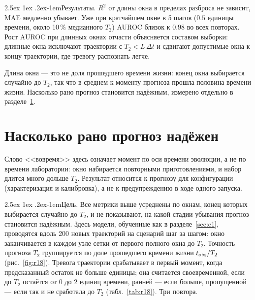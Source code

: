 \documentclass[12pt,a4paper]{report}
\makeatletter
\renewcommand\paragraph{\@startsection{paragraph}{4}{\z@}%
  {2.5ex \@plus1ex \@minus.2ex}{-1em}{\normalfont\normalsize\bfseries}}
\numberwithin{equation}{chapter}
\makeatother
\begin{document}
\paragraph{Результаты.} $R^2$ от длины окна в пределах разброса не зависит,
MAE медленно убывает. Уже при кратчайшем окне в 5 шагов ($0.5$ единицы
времени, около 10\,\% медианного $T_2$) AUROC близок к $0.98$ во всех
повторах. Рост AUROC при длинных окнах отчасти объясняется составом
выборки: длинные окна исключают траектории с $T_2<L\,\Delta t$ и сдвигают
допустимые окна к концу траектории, где тревогу распознать легче.

Длина окна --- это не доля прошедшего времени жизни: конец окна выбирается
случайно до $T_2$, так что в среднем к моменту прогноза прошла половина
времени жизни. Насколько рано прогноз становится надёжным, измерено
отдельно в разделе~\ref{sec:r18}.

\section{Насколько рано прогноз надёжен}
\label{sec:r18}

Слово <<вовремя>> здесь означает момент по оси времени эволюции, а не по
времени лаборатории: окно набирается повторными приготовлениями, и набор
длится много дольше $T_2$. Результат относится к прогнозу для конфигурации
(характеризация и калибровка), а не к предупреждению в ходе одного запуска.

\paragraph{Цель.} Все метрики выше усреднены по окнам, конец которых
выбирается случайно до $T_2$, и не показывают, на какой стадии убывания
прогноз становится надёжным. Здесь модели, обученные как в
разделе~\ref{sec:e1}, проводятся вдоль 200 новых траекторий на сценарий шаг
за шагом: окно заканчивается в каждом узле сетки от первого полного окна до
$T_2$. Точность прогноза $T_2$ группируется по доле прошедшего времени
жизни $t_{\rm obs}/T_2$ (рис.~\ref{fig:r18}). Тревога траектории
срабатывает в первый момент, когда предсказанный остаток не больше единицы;
она считается своевременной, если до $T_2$ остаётся от $0$ до $2$ единиц
времени, ранней --- если больше, пропущенной --- если так и не сработала до
$T_2$ (табл.~\ref{tab:r18}). Три повтора.
\end{document}
